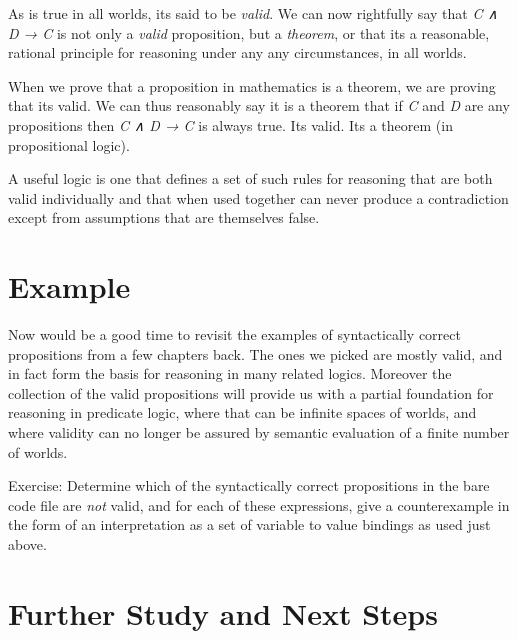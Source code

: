 \documentclass{book}
\begin{document}
As is true in all worlds, it\textquotesingle s said to be \emph{valid}.
We can now rightfully say that \emph{C ∧ D → C} is not
only a \emph{valid} proposition, but a \emph{theorem}, or that it\textquotesingle s a reasonable, rational principle for reasoning under any any circumstances, in all worlds.

When we prove that a proposition in mathematics is a theorem, we are proving that it\textquotesingle s valid. We can thus reasonably say it is a theorem that if \emph{C} and \emph{D} are any propositions then \emph{C ∧ D → C} is always true. It\textquotesingle s valid. It\textquotesingle s a theorem (in propositional logic).

A useful logic is one that defines a set of such rules for reasoning that are both valid individually and that when used together can never produce a contradiction except from assumptions that are themselves false.

\hypertarget{pandoc.profile.debug__pandoc__debug__src__modeltheory.md__example}{%
\section*{Example}\label{pandoc.profile.debug__pandoc__debug__src__modeltheory.md__example}}

Now would be a good time to revisit the examples of
syntactically correct propositions from a few chapters back. The ones we picked are mostly valid, and in fact form the basis for reasoning in many related logics. Moreover the collection of the valid propositions will provide us with a partial foundation for reasoning in predicate logic, where that can be infinite spaces of worlds, and where validity can no longer be assured by semantic evaluation of a finite number of worlds.

Exercise: Determine which of the syntactically correct propositions in the bare code file are \emph{not} valid, and for each of these expressions, give a counterexample in
the form of an interpretation as a set of variable to value bindings as used just above.

\hypertarget{pandoc.profile.debug__pandoc__debug__src__modeltheory.md__further-study-and-next-steps}{%
\section*{Further Study and Next Steps}\label{pandoc.profile.debug__pandoc__debug__src__modeltheory.md__further-study-and-next-steps}}
\end{document}
